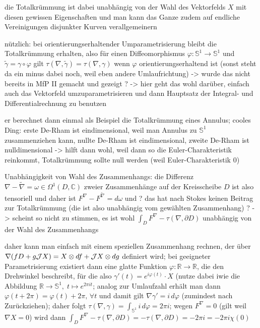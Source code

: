 die Totalkrümmung ist dabei unabhängig von der Wahl des Vektorfelds $X$ mit diesen gewissen Eigenschaften und man kann das Ganze zudem auf endliche Vereinigungen disjunkter Kurven verallgemeinern

nützlich: bei orientierungserhaltender Umparametrisierung bleibt die Totalkrümmung erhalten, also für einen Diffeomorphismus $\varphi: \mathbb{S}^1 \rightarrow \mathbb{S}^1$ und $\tilde{\gamma} = \gamma \circ \varphi$ gilt $\tau(\nabla, \tilde{\gamma}) = \tau(\nabla, \gamma)$ wenn $\varphi$ orientierungserhaltend ist (sonst steht da ein minus dabei noch, weil eben andere Umlaufrichtung) -> wurde das nicht bereits in MfP II gemacht und gezeigt ? -> hier geht das wohl darüber, einfach auch das Vektorfeld umzuparametrisieren und dann Hauptsatz der Integral- und Differentialrechnung zu benutzen


er berechnet dann einmal als Beispiel die Totalkrümmung eines Annulus; cooles Ding: erste De-Rham ist eindimensional, weil man Annulus zu $\mathbb{S}^1$ zusammenziehen kann, nullte De-Rham ist eindimensional, zweite De-Rham ist nulldimensional -> hilft dann wohl, weil dann so die Euler-Charakteristik reinkommt, Totalkrümmung sollte null werden (weil Euler-Charakteristik 0)

Unabhängigkeit von Wahl des Zusammenhangs: die Differenz $\nabla - \tilde{\nabla} = \omega \in \Omega^1(D, \mathbb{C})$ zweier Zusammenhänge auf der Kreisscheibe $D$ ist also tensoriell und daher ist $F^\nabla - F^{\tilde{\nabla}} = d\omega$ und ? das hat nach Stokes keinen Beitrag zur Totalkrümmung (die ist also unabhängig vom gewählten Zusammenhang) ? -> scheint so nicht zu stimmen, es ist wohl $\int_D F^\nabla - \tau(\nabla, \partial D)$ unabhängig von der Wahl des Zusammenhangs

daher kann man einfach mit einem speziellen Zusammenhang rechnen, der über $\nabla\qty(f D + g \mathcal{J} X) = X \otimes df + \mathcal{J}X \otimes dg$ definiert wird; bei geeigneter Parametrisierung existiert dann eine glatte Funktion $\varphi: \mathbb{R} \rightarrow \mathbb{R}$, die den Drehwinkel beschreibt, für die also $\gamma'(t) = e^{i \varphi(t)} \cdot X$ (nutze dabei iwie die Abbildung $\mathbb{R} \rightarrow \mathbb{S}^1, \; t \mapsto e^{2 \pi i t}$; analog zur Umlaufzahl erhält man dann $\varphi(t + 2\pi) = \varphi(t) + 2\pi, \, \forall t$ und damit gilt $\nabla \gamma' = i \, d\varphi$ (zumindest nach Zurückziehen); daher folgt $\tau(\nabla, \gamma) = \int_{\mathbb{S}^1} i \, d\varphi = 2\pi i$; wegen $F^\nabla = 0$ (gilt weil $\nabla X = 0$) wird dann $\int_D F^\nabla - \tau(\nabla, \partial D) = - \tau(\nabla, \partial D) = -2\pi i = -2\pi i \chi(0)$

